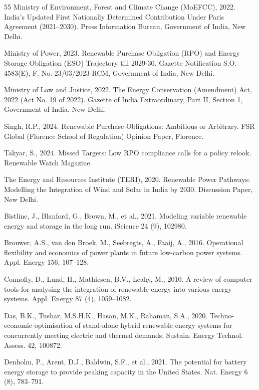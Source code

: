 \documentclass[11pt,a4paper]{article}
\begin{document}
\begin{thebibliography}{55}
Ministry of Environment, Forest and Climate Change (MoEFCC), 2022. India's Updated First Nationally Determined Contribution Under Paris Agreement (2021--2030). Press Information Bureau, Government of India, New Delhi.

Ministry of Power, 2023. Renewable Purchase Obligation (RPO) and Energy Storage Obligation (ESO) Trajectory till 2029-30. Gazette Notification S.O. 4583(E), F. No. 23/03/2023-RCM, Government of India, New Delhi.

Ministry of Law and Justice, 2022. The Energy Conservation (Amendment) Act, 2022 (Act No. 19 of 2022). Gazette of India Extraordinary, Part II, Section 1, Government of India, New Delhi.

Singh, R.P., 2024.
Renewable Purchase Obligations: Ambitious or Arbitrary. FSR Global (Florence School of Regulation) Opinion Paper, Florence.

Takyar, S., 2024.
Missed Targets: Low RPO compliance calls for a policy relook. Renewable Watch Magazine.

The Energy and Resources Institute (TERI), 2020.
Renewable Power Pathways: Modelling the Integration of Wind and Solar in India by 2030. Discussion Paper, New Delhi.

Bistline, J., Blanford, G., Brown, M., et al., 2021.
Modeling variable renewable energy and storage in the long run.
iScience 24 (9), 102980.

Brouwer, A.S., van den Broek, M., Seebregts, A., Faaij, A., 2016.
Operational flexibility and economics of power plants in future low-carbon power systems.
Appl. Energy 156, 107--128.

Connolly, D., Lund, H., Mathiesen, B.V., Leahy, M., 2010.
A review of computer tools for analysing the integration of renewable energy into various energy systems.
Appl. Energy 87 (4), 1059--1082.

Das, B.K., Tushar, M.S.H.K., Hasan, M.K., Rahaman, S.A., 2020.
Techno-economic optimisation of stand-alone hybrid renewable energy systems for concurrently meeting electric and thermal demands.
Sustain. Energy Technol. Assess. 42, 100872.

Denholm, P., Arent, D.J., Baldwin, S.F., et al., 2021.
The potential for battery energy storage to provide peaking capacity in the United States.
Nat. Energy 6 (8), 783--791.


\end{thebibliography}
\end{document}
